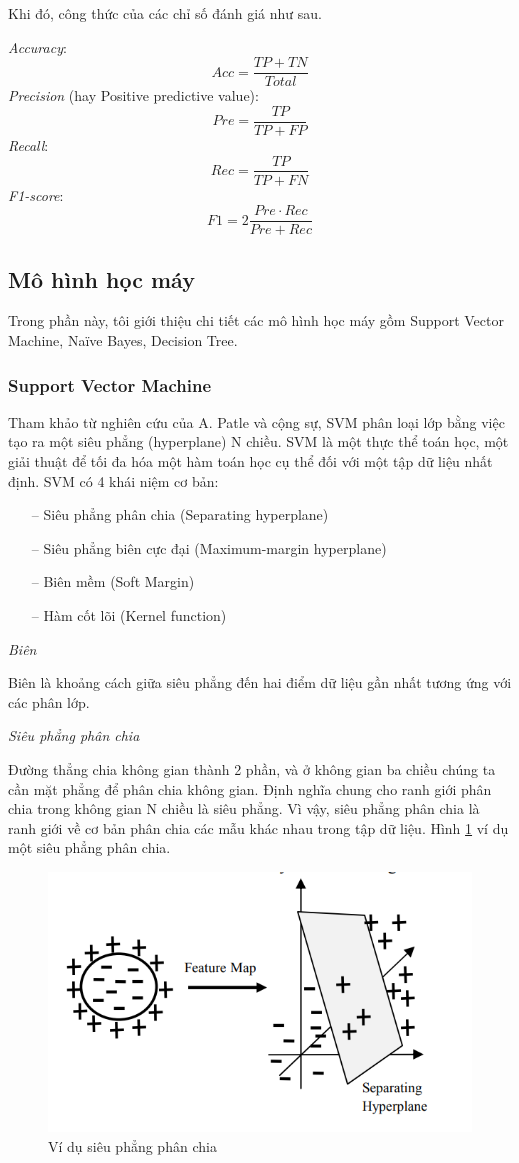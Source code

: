 Khi đó, công thức của các chỉ số đánh giá như sau.

\textit{Accuracy}: 
\[ Acc = \frac{TP + TN}{Total} \]
\textit{Precision} (hay Positive predictive value):
\[ Pre = \frac{TP}{TP + FP} \]
\textit{Recall}:
\[ Rec = \frac{TP}{TP + FN} \]
\textit{F1-score}:
\[ F1 = 2 \frac{Pre \cdot Rec}{Pre + Rec} \]

\subsection{Mô hình học máy}

Trong phần này, tôi giới thiệu chi tiết các mô hình học máy gồm Support Vector Machine, Naïve Bayes, Decision Tree.

\subsubsection{Support Vector Machine}

Tham khảo từ nghiên cứu \cite{67-Patle} của A. Patle và cộng sự, SVM phân loại lớp bằng việc tạo ra một siêu phẳng (hyperplane) N chiều. SVM là một thực thể toán học, một giải thuật để tối đa hóa một hàm toán học cụ thể đối với một tập dữ liệu nhất định. SVM có 4 khái niệm cơ bản:

\begin{itemize} 
	\item[--] Siêu phẳng phân chia (Separating hyperplane)
	\item[--] Siêu phẳng biên cực đại (Maximum-margin hyperplane)
	\item[--] Biên mềm (Soft Margin)
	\item[--] Hàm cốt lõi (Kernel function)  
\end{itemize}
 
 \textit{Biên}
 
 Biên là khoảng cách giữa siêu phẳng đến hai điểm dữ liệu gần nhất tương ứng với các phân lớp.
 
 \textit{Siêu phẳng phân chia}
 
 Đường thẳng chia không gian thành 2 phần, và ở không gian ba chiều chúng ta cần mặt phẳng để phân chia không gian. Định nghĩa chung cho ranh giới phân chia trong không gian N chiều là siêu phẳng. Vì vậy, siêu phẳng phân chia là ranh giới về cơ bản phân chia các mẫu khác nhau trong tập dữ liệu. Hình \ref{fig:separating-hyperplane} ví dụ một siêu phẳng phân chia.
 
 \begin{figure}[ht!]
 	\centering
 	\includegraphics[width=0.5\linewidth]{fig/separating-hyperplane.png}
 	\caption{Ví dụ siêu phẳng phân chia}
 	\label{fig:separating-hyperplane}
 \end{figure}

